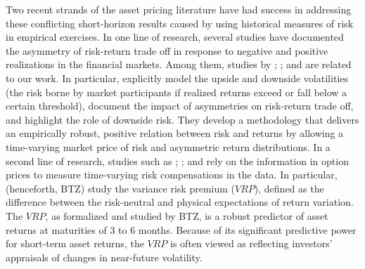 \documentclass[11pt]{article}
\begin{document}
Two recent strands of the asset pricing literature have had success in addressing these conflicting short-horizon results caused by using historical measures of risk in empirical exercises. In one line of research, several studies have documented the asymmetry of risk-return trade off in response to negative and positive realizations in the financial markets. Among them, studies by \citet*{BonomoGarciaTedongapMeddahi10RFS}; \citet*{FJPT13RoF}; and \cite{RossiTimmermann15RFS} are related to our work. In particular, \cite{FJPT13RoF} explicitly model the upside and downside volatilities (the risk borne by market participants if realized returns exceed or fall below a certain threshold), document the impact of asymmetries on risk-return trade off, and highlight the role of downside risk. They develop a methodology that delivers an empirically robust, positive relation between risk and returns by allowing a time-varying market price of risk and asymmetric return distributions. In a second line of research, studies such as \cite{Bakshi01042003}; \cite{Carr01032009}; and \cite{BolTauchZhou09RFS} rely on the information in option prices to measure time-varying risk compensations in the data. In particular, \citet*{BolTauchZhou09RFS} (henceforth, BTZ) study the variance risk premium ($VRP$), defined as the difference between the risk-neutral and physical expectations of return variation. The $VRP$, as  formalized and studied by BTZ, is a robust predictor of asset returns at maturities of 3 to 6 months. Because of its significant predictive power for short-term asset returns, the $VRP$ is often viewed as reflecting investors' appraisals of changes in near-future volatility.
\end{document}
